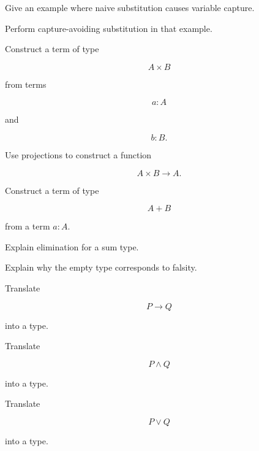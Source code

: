 \begin{exercise}[3]
Give an example where naive substitution causes variable capture.
\end{exercise}

\begin{exercise}[3]
Perform capture-avoiding substitution in that example.
\end{exercise}

\begin{exercise}[2]
Construct a term of type

\[
A\times B
\]

from terms

\[
a:A
\]

and

\[
b:B.
\]
\end{exercise}

\begin{exercise}[2]
Use projections to construct a function

\[
A\times B\to A.
\]
\end{exercise}

\begin{exercise}[2]
Construct a term of type

\[
A+B
\]

from a term \(a:A\).
\end{exercise}

\begin{exercise}[3]
Explain elimination for a sum type.
\end{exercise}

\begin{exercise}[3]
Explain why the empty type corresponds to falsity.
\end{exercise}

\begin{exercise}[2]
Translate

\[
P\rightarrow Q
\]

into a type.
\end{exercise}

\begin{exercise}[2]
Translate

\[
P\land Q
\]

into a type.
\end{exercise}

\begin{exercise}[2]
Translate

\[
P\lor Q
\]

into a type.
\end{exercise}

